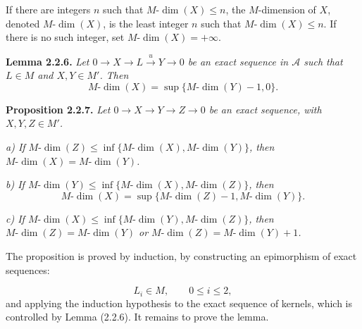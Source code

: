 \clearpage
{}%
\begingroup\small\setlength{\parskip}{0pt}\setlength{\emergencystretch}{1.5em}
\setlength{\abovedisplayskip}{4pt plus 2pt minus 2pt}%
\setlength{\belowdisplayskip}{4pt plus 2pt minus 2pt}%

If there are integers $n$ such that $M\text{-}\dim(X)\leq n$, the
$M$-dimension of $X$, denoted $M\text{-}\dim(X)$, is the least integer
$n$ such that $M\text{-}\dim(X)\leq n$. If there is no such integer, set
$M\text{-}\dim(X)=+\infty$.

\medskip\noindent\textbf{Lemma 2.2.6.}\quad
\textit{Let
$0\longrightarrow X\longrightarrow L\xrightarrow{u}Y\longrightarrow0$
be an exact sequence in $\mathcal A$ such that $L\in M$ and
$X,Y\in M'$. Then}
\[
M\text{-}\dim(X)=\sup\{M\text{-}\dim(Y)-1,0\}.
\]

\medskip\noindent\textbf{Proposition 2.2.7.}\quad
\textit{Let
$0\longrightarrow X\longrightarrow Y\longrightarrow Z\longrightarrow0$
be an exact sequence, with $X,Y,Z\in M'$.}

\noindent\textit{a) If
$M\text{-}\dim(Z)\leq
\inf\{M\text{-}\dim(X),M\text{-}\dim(Y)\}$, then
$M\text{-}\dim(X)=M\text{-}\dim(Y)$.}

\noindent\textit{b) If
$M\text{-}\dim(Y)\leq
\inf\{M\text{-}\dim(X),M\text{-}\dim(Z)\}$, then}
\[
M\text{-}\dim(X)=
\sup\{M\text{-}\dim(Z)-1,M\text{-}\dim(Y)\}.
\]

\noindent\textit{c) If
$M\text{-}\dim(X)\leq
\inf\{M\text{-}\dim(Y),M\text{-}\dim(Z)\}$, then
$M\text{-}\dim(Z)=M\text{-}\dim(Y)$ or
$M\text{-}\dim(Z)=M\text{-}\dim(Y)+1$.}

The proposition is proved by induction, by constructing an epimorphism of
exact sequences:

\begin{center}
\end{center}
\[
L_i\in M,\qquad 0\leq i\leq2,
\]
and applying the induction hypothesis to the exact sequence of kernels,
which is controlled by Lemma (2.2.6). It remains to prove the lemma.


